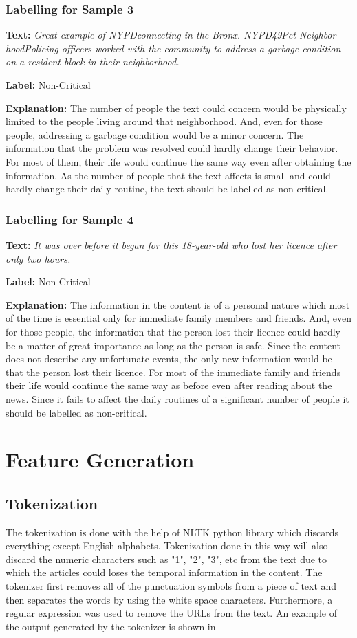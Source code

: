 \subsubsection{Labelling for Sample 3}
\textbf{Text:}
\textit{Great example of NYPDconnecting in the Bronx. NYPD49Pct Neighbor- hoodPolicing officers worked with the community to address a garbage condition on a resident block in their neighborhood.}\par
\textbf{Label:} Non-Critical\par
\textbf{Explanation:} The number of people the text could concern would be physically limited to the people living around that neighborhood. And, even for those people, addressing a garbage condition would be a minor concern. The information that the problem was resolved could hardly change their behavior. For most of them, their life would continue the same way even after obtaining the information. As the number of people that the text affects is small and could hardly change their daily routine, the text should be labelled as non-critical.

\subsubsection{Labelling for Sample 4}
\textbf{Text:}
\textit{It was over before it began for this 18-year-old who lost her licence after only two hours.}\par
\textbf{Label:} Non-Critical\par
\textbf{Explanation:} The information in the content is of a personal nature which most of the time is essential only for immediate family members and friends. And, even for those people, the information that the person lost their licence could hardly be a matter of great importance as long as the person is safe. Since the content does not describe any unfortunate events, the only new information would be that the person lost their licence. For most of the immediate family and friends their life would continue the same way as before even after reading about the news. Since it fails to affect the daily routines of a significant number of people it should be labelled as non-critical.

\section{Feature Generation}
\subsection{Tokenization}
The tokenization is done with the help of NLTK\cite{loper2002nltk} python library which discards everything except English alphabets.  Tokenization done in this way will also discard the numeric characters such as "1", "2", "3", etc from the text due to which the articles could loses the temporal information in the content. The tokenizer first removes all of the punctuation symbols from a piece of text and then separates the words by using the white space characters. Furthermore, a regular expression was used to remove the URLs from the text. An example of the output generated by the tokenizer is shown in 

